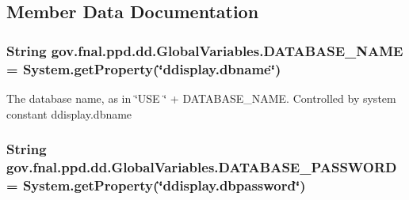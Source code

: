 \subsection{Member Data Documentation}
\hypertarget{classgov_1_1fnal_1_1ppd_1_1dd_1_1GlobalVariables_a737045676a15c469e5cb486d80c08043}{
\subsubsection[{D\-A\-T\-A\-B\-A\-S\-E\-\_\-\-N\-A\-M\-E}]{\setlength{\rightskip}{0pt plus 5cm}String gov.\-fnal.\-ppd.\-dd.\-Global\-Variables.\-D\-A\-T\-A\-B\-A\-S\-E\-\_\-\-N\-A\-M\-E = System.\-get\-Property(\char`\"{}ddisplay.\-dbname\char`\"{})\hspace{0.3cm}{\ttfamily [static]}}}\label{classgov_1_1fnal_1_1ppd_1_1dd_1_1GlobalVariables_a737045676a15c469e5cb486d80c08043}
The database name, as in \char`\"{}\-U\-S\-E \char`\"{} + D\-A\-T\-A\-B\-A\-S\-E\-\_\-\-N\-A\-M\-E. Controlled by system constant ddisplay.\-dbname \hypertarget{classgov_1_1fnal_1_1ppd_1_1dd_1_1GlobalVariables_ae63bd973c9c02683b0c4964179ceefe0}{
\subsubsection[{D\-A\-T\-A\-B\-A\-S\-E\-\_\-\-P\-A\-S\-S\-W\-O\-R\-D}]{\setlength{\rightskip}{0pt plus 5cm}String gov.\-fnal.\-ppd.\-dd.\-Global\-Variables.\-D\-A\-T\-A\-B\-A\-S\-E\-\_\-\-P\-A\-S\-S\-W\-O\-R\-D = System.\-get\-Property(\char`\"{}ddisplay.\-dbpassword\char`\"{})\hspace{0.3cm}{\ttfamily [static]}}}\label{classgov_1_1fnal_1_1ppd_1_1dd_1_1GlobalVariables_ae63bd973c9c02683b0c4964179ceefe0}
